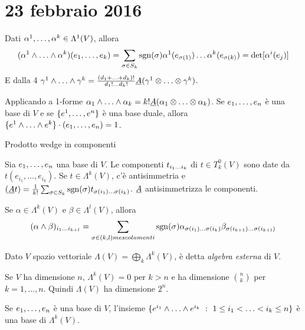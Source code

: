 \chapter{23 febbraio 2016}

\begin{remark}
	Dati $\seqa{\alpha}{k}{,}\in\Lambda^1(V)$, allora
	\begin{equation*}
		(\seqa{\alpha}{k}{\wedge})(\seqb{e}{k}{,}) = \sum_{\sigma\in S_k} \sgn(\sigma) \alpha^1(e_{\sigma(1)}) \ldots \alpha^k(e_{\sigma(k)}) = \det[\alpha^i(e_j)]
	\end{equation*}
	E dalla 4 $\seqa{\gamma}{k}{\wedge} = \frac{(\seqb{d}{k}{+})!}{d_1!\ldots d_k!}\antisimm (\seqa{\gamma}{k}{\otimes})$.
	
	Applicando a 1-forme $\seqb{\alpha}{k}{\wedge} = k! \antisimm(\seqb{\alpha}{k}{\otimes})$.
	Se $\seqb en,$ è una base di $V$ e se $\{\seqa en,\}$ è una base duale, allora $\{\seqa ek\wedge \}\cdot (\seqb en,) = 1$.

\end{remark}

Prodotto wedge in componenti

Sia $\seqb en,$ una base di $V$. Le componenti $t_{\seqb ik{}}$ di $t\in T^0_k(V)$ sono date da $t(e_{i_1},\ldots,e_{i_k})$.
Se $t\in\Lambda^k(V)$, c'è antisimmetria e $(\antisimm t) = \frac 1{k!} \sum_{\sigma\in S_k} \sgn(\sigma) t_{\sigma(i_1)\ldots\sigma(i_k)}$. $\antisimm$ antisimmetrizza le componenti.

Se $\alpha\in\Lambda^k(V)$ e $\beta\in\Lambda^l(V)$, allora
\begin{equation*}
	(\alpha\wedge\beta)_{\seqb{i}{k+l}{}} = \sum_{\sigma\in(k,l) mescolamenti} \sgn(\sigma) \alpha_{\sigma(i_1)\ldots\sigma(i_k)} \beta_{\sigma(i_{k+1})\ldots\sigma(i_{k+l})}
\end{equation*}

\begin{definition}
	Dato $V$ spazio vettoriale $\Lambda(V)=\bigoplus_k\Lambda^k(V)$, è detta \emph{algebra esterna} di $V$.
\end{definition}

\begin{proposition}
	Se $V$ ha dimensione $n$, $\Lambda^k(V)=0$ per $k>n$ e ha dimensione $\binom nk$ per $k=1,\ldots,n$. Quindi $\Lambda(V)$ ha dimensione $2^n$.
	
	Se $\seqb en,$ è una base di $V$, l'insieme $\{ e^{i_1}\wedge\ldots\wedge e^{i_k} \suchthat 1\le i_1< \ldots < i_k\le n\}$ è una base di $\Lambda^k(V)$.
\end{proposition}

